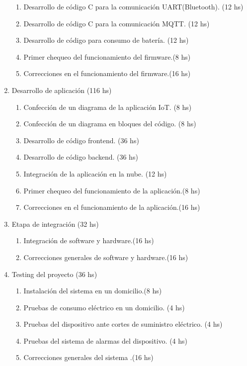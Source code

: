 \documentclass[
11pt, %
]{charter}
\begin{document}
\begin{enumerate}
\begin{enumerate}
	\item Desarrollo de código C para la comunicación UART(Bluetooth).	(12 hs)
	\item Desarrollo de código C para la comunicación MQTT.	(12 hs)
	\item Desarrollo de código para consumo de batería.	(12 hs)
	\item Primer chequeo del funcionamiento del firmware.(8 hs)
	\item Correcciones en el funcionamiento del firmware.(16 hs)
	\end{enumerate}
\item Desarrollo de aplicación (116 hs)
	\begin{enumerate}
	\item Confección de un diagrama de la aplicación IoT.	(8 hs)
	\item Confección de un diagrama en bloques del código.	(8 hs)
	\item Desarrollo de código frontend. (36 hs)
	\item Desarrollo de código backend. (36 hs)
	\item Integración de la aplicación en la nube. (12 hs)
	\item Primer chequeo del funcionamiento de la  aplicación.(8 hs)
	\item Correcciones en el funcionamiento de la  aplicación.(16 hs)
	\end{enumerate}

\item Etapa de integración (32 hs)
	\begin{enumerate}
	\item Integración de software y  hardware.(16 hs)
	\item Correcciones generales de software y  hardware.(16 hs)
	\end{enumerate}
	
\item Testing del proyecto (36 hs)
	\begin{enumerate}
	\item Instalación del sistema en un domicilio.(8 hs)
	\item Pruebas de consumo eléctrico en un domicilio.	(4 hs)
	\item Pruebas del dispositivo ante cortes de suministro eléctrico.	(4 hs)
	\item Pruebas del sistema de alarmas del dispositivo.	(4 hs)
	\item Correcciones generales del sistema .(16 hs)
	\end{enumerate}
	

\end{enumerate}
\end{document}

